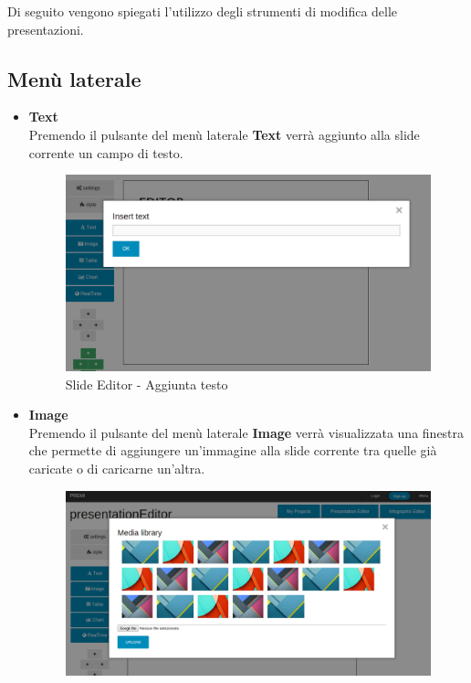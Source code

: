 \noindent
Di seguito vengono spiegati l'utilizzo degli strumenti di modifica delle presentazioni.

\subsection{Menù laterale}
\begin{itemize}
 \item \textbf{Text}\\
    Premendo il pulsante del menù laterale \textbf{Text} verrà aggiunto alla \gls{slide} corrente un campo di testo.
    \begin{figure}[h] 
	\centering 
	\includegraphics[scale=0.30] {img/MUAddText.png}
	\caption{Slide Editor - Aggiunta testo} 
    \end{figure}
 \item \textbf{Image}\\
    Premendo il pulsante del menù laterale \textbf{Image} verrà visualizzata una finestra che permette di aggiungere un'immagine alla \gls{slide} corrente tra quelle già caricate o di caricarne un'altra.
     \begin{figure}[h] 
	\centering 
	\includegraphics[scale=0.30] {img/MUAddImage.png}

\end{figure}
\end{itemize}

